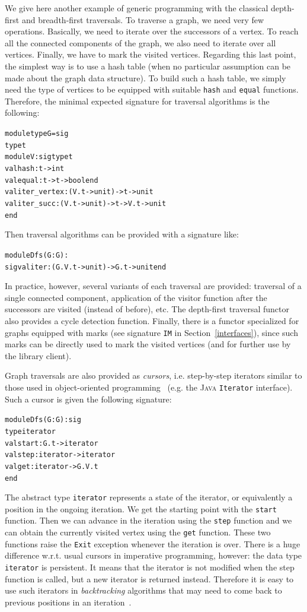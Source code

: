 \documentclass[]{tfp05symp}
\begin{document}
We give here another example of generic programming with the classical
depth-first and breadth-first traversals. To traverse a graph, we
need very few operations. Basically, we need to iterate over the
successors of a vertex. To reach all the connected components of the
graph, we also need to iterate over all vertices. Finally, we have to
mark the visited vertices. Regarding this last point, the simplest way is
to use a hash table (when no particular assumption can be made about
the graph data structure). To build such a hash table, we simply need
the type of vertices to be equipped with suitable \texttt{hash} and
\texttt{equal} functions. Therefore, the minimal expected signature
for traversal algorithms is the following:
\begin{alltt}
module type G = sig
  type t
  module V : sig type t 
                 val hash : t -> int 
                 val equal : t -> t -> bool end
  val iter_vertex : (V.t -> unit) -> t -> unit
  val iter_succ : (V.t -> unit) -> t -> V.t -> unit
end
\end{alltt}
Then traversal algorithms can be provided with a signature like:
\begin{alltt}
module Dfs(G : G) : 
  sig val iter : (G.V.t -> unit) -> G.t -> unit end
\end{alltt}
In practice, however, several variants of each traversal are provided:
traversal of a single connected component, application of the visitor
function after the successors are visited (instead of before),
etc. The depth-first traversal functor also provides a cycle detection
function. Finally, there is a functor specialized for graphs equipped
with marks (see signature \texttt{IM} in Section~\ref{interfaces}),
since such marks can be directly used to mark the visited vertices (and
for further use by the library client).

Graph traversals are also provided as \emph{cursors},
i.e. step-by-step iterators similar to those used in object-oriented
programming~\cite{coplien92} (e.g. the \textsc{Java}
\texttt{Iterator} interface).
Such a cursor is given the following signature:
\begin{alltt}
module Dfs(G : G) : sig
  type iterator
  val start : G.t -> iterator
  val step : iterator -> iterator
  val get : iterator -> G.V.t
end 
\end{alltt}
The abstract type \texttt{iterator} represents a state of the
iterator, or equivalently a position in the ongoing iteration. We get
the starting point with the \texttt{start} function. Then we can
advance in the iteration using the \texttt{step} function and we can
obtain the currently visited vertex using the \texttt{get} function.
These two functions raise the \texttt{Exit} exception whenever the
iteration is over. There is a huge difference w.r.t. usual cursors in
imperative programming, however: the data type \texttt{iterator} is
persistent. It means that the iterator is not modified when the step
function is called, but a new iterator is returned instead. Therefore
it is easy to use such iterators in \emph{backtracking} algorithms
that may need to come back to previous positions in an
iteration~\cite{filliatre06}. 
\end{document}
